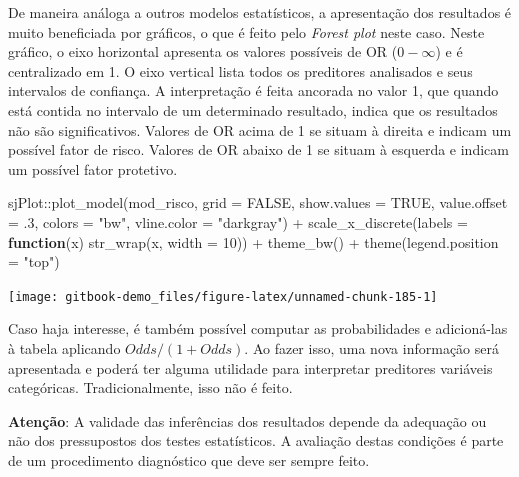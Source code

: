 \documentclass[
]{book}
\newenvironment{Shaded}{\begin{snugshade}}{\end{snugshade}}
\newcommand{\AttributeTok}[1]{\textcolor[rgb]{0.77,0.63,0.00}{#1}}
\newcommand{\ConstantTok}[1]{\textcolor[rgb]{0.00,0.00,0.00}{#1}}
\newcommand{\ControlFlowTok}[1]{\textcolor[rgb]{0.13,0.29,0.53}{\textbf{#1}}}
\newcommand{\DecValTok}[1]{\textcolor[rgb]{0.00,0.00,0.81}{#1}}
\newcommand{\FunctionTok}[1]{\textcolor[rgb]{0.00,0.00,0.00}{#1}}
\newcommand{\NormalTok}[1]{#1}
\newcommand{\SpecialCharTok}[1]{\textcolor[rgb]{0.00,0.00,0.00}{#1}}
\newcommand{\StringTok}[1]{\textcolor[rgb]{0.31,0.60,0.02}{#1}}
\begin{document}
De maneira análoga a outros modelos estatísticos, a apresentação dos resultados é muito beneficiada por gráficos, o que é feito pelo \emph{Forest plot} neste caso. Neste gráfico, o eixo horizontal apresenta os valores possíveis de OR (\(0-\infty\)) e é centralizado em 1. O eixo vertical lista todos os preditores analisados e seus intervalos de confiança. A interpretação é feita ancorada no valor 1, que quando está contida no intervalo de um determinado resultado, indica que os resultados não são significativos. Valores de OR acima de 1 se situam à direita e indicam um possível fator de risco. Valores de OR abaixo de 1 se situam à esquerda e indicam um possível fator protetivo.

\begin{Shaded}
\begin{Highlighting}[]
\NormalTok{sjPlot}\SpecialCharTok{::}\FunctionTok{plot\_model}\NormalTok{(mod\_risco,}
            \AttributeTok{grid =} \ConstantTok{FALSE}\NormalTok{, }
            \AttributeTok{show.values =} \ConstantTok{TRUE}\NormalTok{, }\AttributeTok{value.offset =}\NormalTok{ .}\DecValTok{3}\NormalTok{, }
            \AttributeTok{colors =} \StringTok{"bw"}\NormalTok{,}
            \AttributeTok{vline.color =} \StringTok{"darkgray"}\NormalTok{) }\SpecialCharTok{+}
  \FunctionTok{scale\_x\_discrete}\NormalTok{(}\AttributeTok{labels =} \ControlFlowTok{function}\NormalTok{(x) }\FunctionTok{str\_wrap}\NormalTok{(x, }\AttributeTok{width =} \DecValTok{10}\NormalTok{)) }\SpecialCharTok{+}
  \FunctionTok{theme\_bw}\NormalTok{() }\SpecialCharTok{+}
  \FunctionTok{theme}\NormalTok{(}\AttributeTok{legend.position =} \StringTok{"top"}\NormalTok{)}
\end{Highlighting}
\end{Shaded}

\begin{center}\texttt{[image: gitbook-demo\_files/figure-latex/unnamed-chunk-185-1]} \end{center}

Caso haja interesse, é também possível computar as probabilidades e adicioná-las à tabela aplicando \(Odds/(1+Odds)\). Ao fazer isso, uma nova informação será apresentada e poderá ter alguma utilidade para interpretar preditores variáveis categóricas. Tradicionalmente, isso não é feito.

\textbf{Atenção}: A validade das inferências dos resultados depende da adequação ou não dos pressupostos dos testes estatísticos. A avaliação destas condições é parte de um procedimento diagnóstico que deve ser sempre feito.
\end{document}
